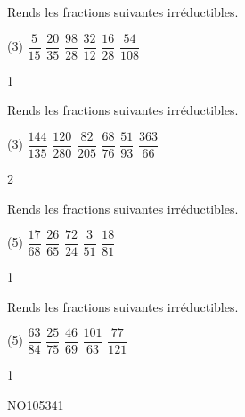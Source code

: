 \documentclass[a4paper,11pt]{report}
\begin{document}
\begin{exo}{
Rends les fractions suivantes irréductibles.
\begin{tasks}[after-item-skip = 0.4em, after-skip=-0.5em](3)
    \task $\dfrac{5}{15}$
    \task $\dfrac{20}{35}$
    \task $\dfrac{98}{28}$
    \task $\dfrac{32}{12}$
    \task $\dfrac{16}{28}$
    \task $\dfrac{54}{108}$
\end{tasks}
}{1}\end{exo}

\begin{exo}{
Rends les fractions suivantes irréductibles.
\begin{tasks}[after-item-skip = 0.4em, after-skip=-0.5em](3)
    \task $\dfrac{144}{135}$
    \task $\dfrac{120}{280}$
    \task $\dfrac{82}{205}$
    \task $\dfrac{68}{76}$
    \task $\dfrac{51}{93}$
    \task $\dfrac{363}{66}$
\end{tasks}
}{2}\end{exo}

\begin{exo}{
Rends les fractions suivantes irréductibles.
\begin{tasks}[after-item-skip = 0.4em, after-skip=-0.5em](5)
\task $\dfrac{17}{68}$
\task $\dfrac{26}{65}$
\task $\dfrac{72}{24}$
\task $\dfrac{3}{51}$
\task $\dfrac{18}{81}$
\end{tasks}
}{1}\end{exo}

\begin{exo}{
Rends les fractions suivantes irréductibles.
\begin{tasks}[after-item-skip = 0.4em, after-skip=-0.5em](5)
\task $\dfrac{63}{84}$
\task $\dfrac{25}{75}$
\task $\dfrac{46}{69}$
\task $\dfrac{101}{63}$
\task $\dfrac{77}{121}$
\end{tasks}
}{1}\end{exo}

\begin{exof}{NO105}{34}{1}
\end{exof}
\end{document}
